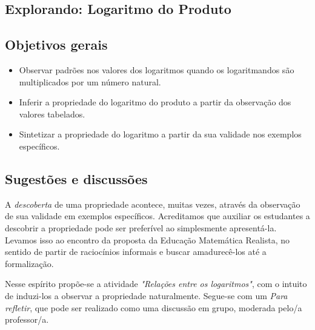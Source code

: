 \clearpage
\def\currentcolor{session1}
\begin{texto}
{
	\section{Explorando: Logaritmo do Produto}
	\subsection{Objetivos gerais}
	\begin{itemize}
	\item Observar padrões nos valores dos logaritmos quando os logaritmandos são multiplicados por um número natural.
	\item Inferir a propriedade do logaritmo do produto a partir da observação dos valores tabelados.
	\item Sintetizar a propriedade do logaritmo a partir da sua validade nos exemplos específicos.
	\end{itemize}

	\subsection{Sugestões e discussões}

	A \textit{descoberta} de uma propriedade acontece, muitas vezes, através da observação de sua validade em exemplos específicos. Acreditamos que auxiliar os estudantes a descobrir a propriedade pode ser preferível ao simplesmente apresentá-la. Levamos isso ao encontro da proposta da Educação Matemática Realista, no sentido de partir de raciocínios informais e buscar amadurecê-los até a formalização.

	Nesse espírito propõe-se a atividade \textit{"Relações entre os logaritmos"}, com o intuito de induzi-los a observar a propriedade naturalmente. Segue-se com um \textit{Para refletir}, que pode ser realizado como uma discussão em grupo, moderada pelo/a professor/a.
	\vspace{2em}
}
\end{texto}
